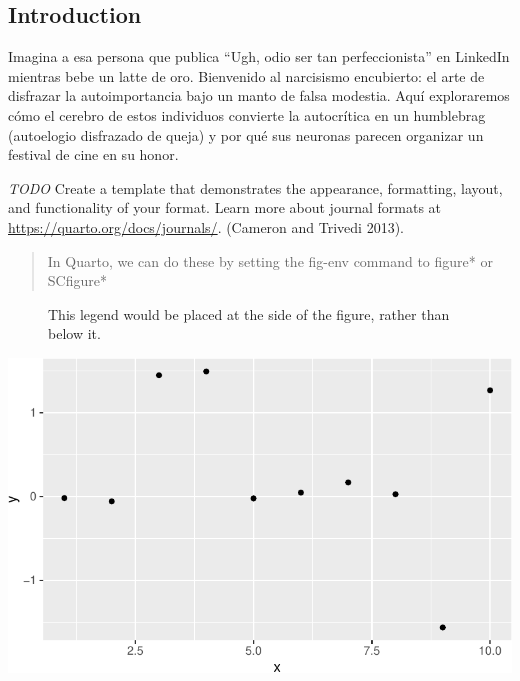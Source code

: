\documentclass[
]{article}
\begin{document}
\subsection{Introduction}\label{sec-intro}

Imagina a esa persona que publica ``Ugh, odio ser tan perfeccionista''
en LinkedIn mientras bebe un latte de oro. Bienvenido al narcisismo
encubierto: el arte de disfrazar la autoimportancia bajo un manto de
falsa modestia. Aquí exploraremos cómo el cerebro de estos individuos
convierte la autocrítica en un humblebrag (autoelogio disfrazado de
queja) y por qué sus neuronas parecen organizar un festival de cine en
su honor.

\emph{TODO} Create a template that demonstrates the appearance,
formatting, layout, and functionality of your format. Learn more about
journal formats at \url{https://quarto.org/docs/journals/}. (Cameron and
Trivedi 2013).

\begin{quote}
In Quarto, we can do these by setting the fig-env command to figure* or
SCfigure*
\end{quote}

\begin{figure}


\caption{\label{fig-side}This legend would be placed at the side of the
figure, rather than below it.}

\end{figure}%

\includegraphics{template_files/figure-pdf/unnamed-chunk-2-1.pdf}
\end{document}

